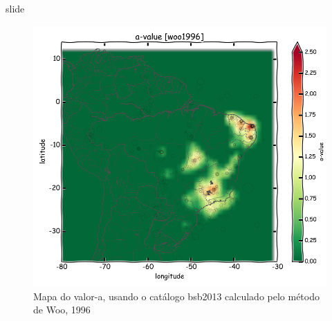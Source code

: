 \documentclass[ucs,8pt]{beamer}
\begin{document}
\begin{frame}{slide}

\begin{figure}[H]
  \centering
  \includegraphics[height=.80\textheight]{a_woo} 
  \caption{Mapa do valor-a, usando o catálogo \gls{bsb2013} calculado pelo método de Woo, 1996 }
  \label{fig:a_woo} 
\end{figure}

\end{frame}
\end{document}
